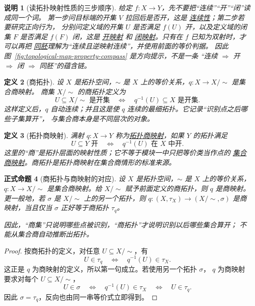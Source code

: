 \documentclass[UTF8,fontset=none,a4paper,11pt]{ctexart}
\theoremstyle{foundation-definition}
\newtheorem{definition}{定义}[section]
\theoremstyle{foundation-theorem}
\theoremstyle{foundation-proposition}
\newtheorem{proposition}[definition]{正式命题}
\theoremstyle{foundation-example}
\theoremstyle{foundation-remark}
\newtheorem{remark}[definition]{说明}
\theoremstyle{foundation-theorem}
\newcommand{\term}[2]{\hyperref[#1]{#2}}
\begin{document}
\begin{remark}[读拓扑映射性质的三步顺序]\label{rem:topological-map-property-check}
给定 \(f:X\to Y\)，先不要把“连续”“开”“闭”读成同一个词。
第一步问目标端的开集 \(V\) 拉回后是否开，这是
\term{def:continuous-map}{连续性}；第二步若要研究正向行为，
分别问定义域的开集 \(U\) 是否满足 \(f(U)\) 开，以及定义域的闭集 \(F\) 是否满足
\(f(F)\) 闭，这是 \term{def:open-map}{开映射} 和
\term{def:closed-map}{闭映射}。只有在 \(f\) 已知为双射时，才可以再把
\term{def:homeomorphism}{同胚}理解为“连续且逆映射连续”，并使用前面的等价判据。
因此图~\ref{fig:topological-map-property-compass} 是方向提示，不是一条
“连续 \(\Rightarrow\) 开 \(\Rightarrow\) 闭 \(\Rightarrow\) 同胚”的蕴含链。
\end{remark}

\begin{definition}[商拓扑]\label{def:quotient-topology}
设 \(X\) 是拓扑空间，\(\sim\) 是 \(X\) 上的等价关系，\(q:X\to X/{\sim}\) 是集合商映射。
商集 \(X/{\sim}\) 的商拓扑定义为
\[
U\subseteq X/{\sim}\text{ 是开集}
\quad\Longleftrightarrow\quad
q^{-1}(U)\subseteq X\text{ 是开集}.
\]
这样定义后，\(q\) 自动连续；并且这是使 \(q\) 连续的最细拓扑。它记录“识别点之后哪些子集算开”，
与集合商本身是不同层次的对象。
\end{definition}

\begin{definition}[拓扑商映射]\label{def:topological-quotient-map}
满射 \(q:X\to Y\) 称为\term{def:topological-quotient-map}{拓扑商映射}，如果 \(Y\) 的拓扑满足
\[
U\subseteq Y\text{ 开}\quad\Longleftrightarrow\quad q^{-1}(U)\text{ 在 }X\text{ 中开}.
\]
这里的“商”是拓扑层面的映射性质；它不等于模块一中只把等价类当作点的
\term{def:quotient-map}{集合商映射}。商拓扑是拓扑商映射在集合商情形的标准来源。
\end{definition}

\begin{proposition}[商拓扑与商映射的对应]
\label{prop:quotient-topology-characterization}
设 $X$ 是拓扑空间，$\sim$ 是 $X$ 上的等价关系，
$q:X\to X/{\sim}$ 是集合商映射。给 $X/{\sim}$ 赋予前面定义的商拓扑，则
$q$ 是商映射。更一般地，若 $\sigma$ 是 $X/{\sim}$ 上的另一个拓扑，则
$q:(X,\tau_X)\to(X/{\sim},\sigma)$ 是商映射，当且仅当
$\sigma$ 正好等于商拓扑 $\tau_q$。

因此，“商集”只说明哪些点被识别，“商拓扑”才说明识别以后哪些集合算开；
不能从集合商自动推断出拓扑。
\end{proposition}

\begin{proof}
按商拓扑的定义，对任意 $U\subseteq X/{\sim}$，有
\[
 U\in\tau_q
 \quad\Longleftrightarrow\quad
 q^{-1}(U)\in\tau_X.
\]
这正是 $q$ 为商映射的定义，所以第一句成立。若使用另一个拓扑 $\sigma$，
$q$ 为商映射要求对每个 $U\subseteq X/{\sim}$，
\[
 U\in\sigma
 \quad\Longleftrightarrow\quad
 q^{-1}(U)\in\tau_X
 \quad\Longleftrightarrow\quad U\in\tau_q.
\]
因此 $\sigma=\tau_q$，反向也由同一串等价式立即得到。
\end{proof}
\end{document}
